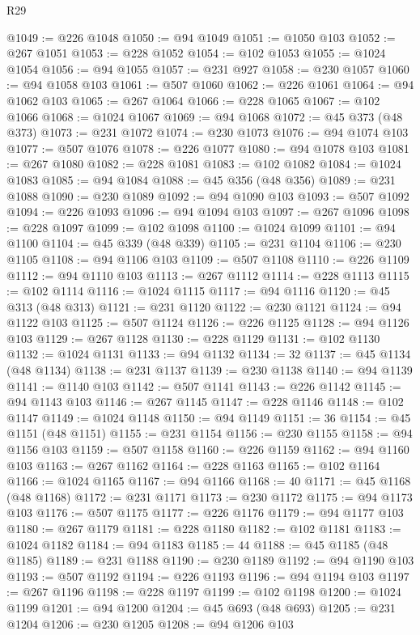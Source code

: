 \begin{lexlean}{R29}
\begin{coremodule}
@1049 := @226 @1048
@1050 := @94 @1049
@1051 := @1050 @103
@1052 := @267 @1051
@1053 := @228 @1052
@1054 := @102 @1053
@1055 := @1024 @1054
@1056 := @94 @1055
@1057 := @231 @927
@1058 := @230 @1057
@1060 := @94 @1058 @103
@1061 := @507 @1060
@1062 := @226 @1061
@1064 := @94 @1062 @103
@1065 := @267 @1064
@1066 := @228 @1065
@1067 := @102 @1066
@1068 := @1024 @1067
@1069 := @94 @1068
@1072 := @45 @373 (@48 @373)
@1073 := @231 @1072
@1074 := @230 @1073
@1076 := @94 @1074 @103
@1077 := @507 @1076
@1078 := @226 @1077
@1080 := @94 @1078 @103
@1081 := @267 @1080
@1082 := @228 @1081
@1083 := @102 @1082
@1084 := @1024 @1083
@1085 := @94 @1084
@1088 := @45 @356 (@48 @356)
@1089 := @231 @1088
@1090 := @230 @1089
@1092 := @94 @1090 @103
@1093 := @507 @1092
@1094 := @226 @1093
@1096 := @94 @1094 @103
@1097 := @267 @1096
@1098 := @228 @1097
@1099 := @102 @1098
@1100 := @1024 @1099
@1101 := @94 @1100
@1104 := @45 @339 (@48 @339)
@1105 := @231 @1104
@1106 := @230 @1105
@1108 := @94 @1106 @103
@1109 := @507 @1108
@1110 := @226 @1109
@1112 := @94 @1110 @103
@1113 := @267 @1112
@1114 := @228 @1113
@1115 := @102 @1114
@1116 := @1024 @1115
@1117 := @94 @1116
@1120 := @45 @313 (@48 @313)
@1121 := @231 @1120
@1122 := @230 @1121
@1124 := @94 @1122 @103
@1125 := @507 @1124
@1126 := @226 @1125
@1128 := @94 @1126 @103
@1129 := @267 @1128
@1130 := @228 @1129
@1131 := @102 @1130
@1132 := @1024 @1131
@1133 := @94 @1132
@1134 := 32
@1137 := @45 @1134 (@48 @1134)
@1138 := @231 @1137
@1139 := @230 @1138
@1140 := @94 @1139
@1141 := @1140 @103
@1142 := @507 @1141
@1143 := @226 @1142
@1145 := @94 @1143 @103
@1146 := @267 @1145
@1147 := @228 @1146
@1148 := @102 @1147
@1149 := @1024 @1148
@1150 := @94 @1149
@1151 := 36
@1154 := @45 @1151 (@48 @1151)
@1155 := @231 @1154
@1156 := @230 @1155
@1158 := @94 @1156 @103
@1159 := @507 @1158
@1160 := @226 @1159
@1162 := @94 @1160 @103
@1163 := @267 @1162
@1164 := @228 @1163
@1165 := @102 @1164
@1166 := @1024 @1165
@1167 := @94 @1166
@1168 := 40
@1171 := @45 @1168 (@48 @1168)
@1172 := @231 @1171
@1173 := @230 @1172
@1175 := @94 @1173 @103
@1176 := @507 @1175
@1177 := @226 @1176
@1179 := @94 @1177 @103
@1180 := @267 @1179
@1181 := @228 @1180
@1182 := @102 @1181
@1183 := @1024 @1182
@1184 := @94 @1183
@1185 := 44
@1188 := @45 @1185 (@48 @1185)
@1189 := @231 @1188
@1190 := @230 @1189
@1192 := @94 @1190 @103
@1193 := @507 @1192
@1194 := @226 @1193
@1196 := @94 @1194 @103
@1197 := @267 @1196
@1198 := @228 @1197
@1199 := @102 @1198
@1200 := @1024 @1199
@1201 := @94 @1200
@1204 := @45 @693 (@48 @693)
@1205 := @231 @1204
@1206 := @230 @1205
@1208 := @94 @1206 @103

\end{coremodule}
\end{lexlean}
